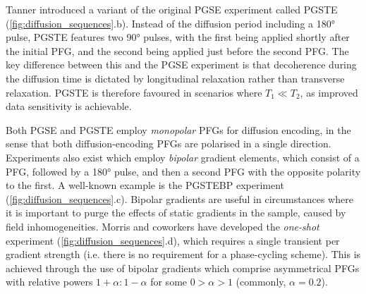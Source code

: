 Tanner introduced a variant of the original \ac{PGSE} experiment called
\ac{PGSTE}\cite{Tanner1970} (\cref{fig:diffusion_sequences}.b). Instead
of the diffusion period including a
\ang{180} pulse, \ac{PGSTE} features two \ang{90} pulses, with the first being
applied shortly after the initial \ac{PFG}, and the second being applied just
before the second \ac{PFG}. The key difference between this and the \ac{PGSE}
experiment is that decoherence during the diffusion time is
dictated by longitudinal relaxation rather than transverse relaxation.
\ac{PGSTE} is therefore favoured in scenarios where $T_1 \ll T_2$, as improved
data sensitivity is achievable.

Both \ac{PGSE} and \ac{PGSTE} employ \emph{monopolar} \acp{PFG} for diffusion
encoding, in the sense that both diffusion-encoding \acp{PFG} are polarised in a
single direction. Experiments also exist which employ
\emph{bipolar} gradient elements\cite{Cotts1989,Wu1995}, which consist of a
\ac{PFG}, followed by a \ang{180} pulse, and then a second \ac{PFG} with the
opposite polarity to the first. A well-known example is the \ac{PGSTEBP}
experiment (\cref{fig:diffusion_sequences}.c). Bipolar gradients are
useful in circumstances where it is important to purge the effects of static
gradients in the sample, caused by field inhomogeneities. Morris and coworkers
have developed the \emph{one-shot} experiment\cite{Pelta2002}
(\cref{fig:diffusion_sequences}.d), which requires a single transient per
gradient strength (i.e. there is no requirement for a phase-cycling scheme).
This is achieved through the use of bipolar gradients which comprise
asymmetrical \acp{PFG} with relative powers $1 + \alpha : 1 - \alpha$ for some
$ 0 > \alpha > 1$ (commonly, $\alpha=0.2$).

